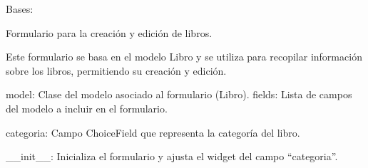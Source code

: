 \documentclass[letterpaper,10pt,spanish]{sphinxmanual}
\begin{document}
\begin{fulllineitems}
\label{\detokenize{modules/appejemplares:appejemplares.forms.LibroForm}}
\pysigstartsignatures
{}
\pysigstopsignatures
\sphinxAtStartPar
Bases: 

\sphinxAtStartPar
Formulario para la creación y edición de libros.

\sphinxAtStartPar
Este formulario se basa en el modelo Libro y se utiliza para recopilar
información sobre los libros, permitiendo su creación y edición.
\begin{description}
\sphinxAtStartPar
model: Clase del modelo asociado al formulario (Libro).
fields: Lista de campos del modelo a incluir en el formulario.

\sphinxAtStartPar
categoria: Campo ChoiceField que representa la categoría del libro.

\sphinxAtStartPar
\_\_init\_\_: Inicializa el formulario y ajusta el widget del campo “categoria”.

\end{description}

\begin{fulllineitems}
\label{\detokenize{modules/appejemplares:appejemplares.forms.LibroForm.CATEGORIAS_CHOICES}}
\pysigstartsignatures
{}
\pysigstopsignatures
\end{fulllineitems}


\end{fulllineitems}
\end{document}
